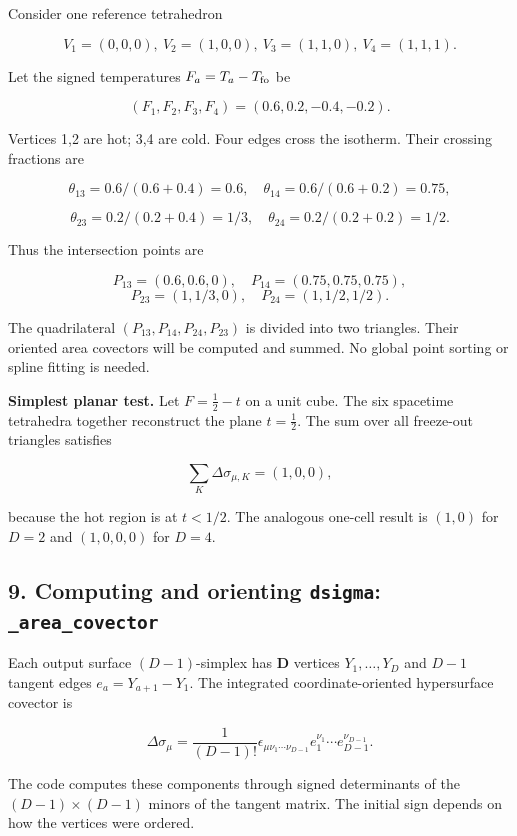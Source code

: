 \documentclass[
  10pt,
]{article}
\begin{document}
Consider one reference tetrahedron

\[
V_1=(0,0,0),\ V_2=(1,0,0),\ V_3=(1,1,0),\ V_4=(1,1,1).
\]

Let the signed temperatures \(F_a=T_a-T_{\rm fo}\) be

\[
(F_1,F_2,F_3,F_4)=(0.6,0.2,-0.4,-0.2).
\]

Vertices 1,2 are hot; 3,4 are cold. Four edges cross the isotherm. Their
crossing fractions are

\[
\theta_{13}=0.6/(0.6+0.4)=0.6,\quad
\theta_{14}=0.6/(0.6+0.2)=0.75,
\]

\[
\theta_{23}=0.2/(0.2+0.4)=1/3,\quad
\theta_{24}=0.2/(0.2+0.2)=1/2.
\]

Thus the intersection points are

\[
P_{13}=(0.6,0.6,0),\quad P_{14}=(0.75,0.75,0.75),
\] \[
P_{23}=(1,1/3,0),\quad P_{24}=(1,1/2,1/2).
\]

The quadrilateral \((P_{13},P_{14},P_{24},P_{23})\) is divided into two
triangles. Their oriented area covectors will be computed and summed. No
global point sorting or spline fitting is needed.

\textbf{Simplest planar test.} Let \(F=\tfrac12-t\) on a unit cube. The
six spacetime tetrahedra together reconstruct the plane \(t=\tfrac12\).
The sum over all freeze-out triangles satisfies

\[
\sum_{K}\Delta\sigma_{\mu,K}=(1,0,0),
\]

because the hot region is at \(t<1/2\). The analogous one-cell result is
\((1,0)\) for \(D=2\) and \((1,0,0,0)\) for \(D=4\).

\subsection{\texorpdfstring{9. Computing and orienting \texttt{dsigma}:
\texttt{\_area\_covector}}{9. Computing and orienting dsigma: \_area\_covector}}\label{computing-and-orienting-dsigma-_area_covector}

Each output surface \((D-1)\)-simplex has \textbf{D} vertices
\(Y_1,\ldots,Y_D\) and \(D-1\) tangent edges \(e_a=Y_{a+1}-Y_1\). The
integrated coordinate-oriented hypersurface covector is

\[
\boxed{\displaystyle
\Delta\sigma_\mu=\frac1{(D-1)!}
\epsilon_{\mu\nu_1\cdots\nu_{D-1}}
 e_1^{\nu_1}\cdots e_{D-1}^{\nu_{D-1}}.}
\]

The code computes these components through signed determinants of the
\((D-1)\times(D-1)\) minors of the tangent matrix. The initial sign
depends on how the vertices were ordered.
\end{document}
